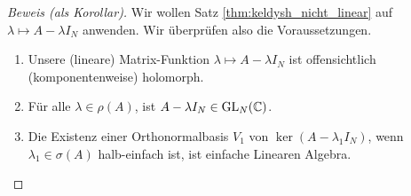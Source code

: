 \begin{proof}[Beweis (als Korollar)]

    Wir wollen Satz \ref{thm:keldysh_nicht_linear} auf $\lambda \mapsto A - \lambda I_N$ anwenden.
    Wir überprüfen also die Voraussetzungen.

    \begin{enumerate}[label = \arabic*.]

        \item Unsere (lineare) Matrix-Funktion $\lambda \mapsto A - \lambda I_N$ ist offensichtlich (komponentenweise) holomorph.

        \item Für alle $\lambda \in \rho(A)$, ist $A - \lambda I_N \in \operatorname{GL}_N(\mathbb{C})$.

        \item Die Existenz einer Orthonormalbasis $V_1$ von $\ker (A - \lambda_1 I_N)$, wenn $\lambda_1 \in \sigma(A)$ halb-einfach ist, ist einfache Linearen Algebra.

        \begin{comment}

            Seien $\lambda_2, \dots, \lambda_k$ die restlichen (paarweise verschiedenen) Eigenwerte von $A$.
            Seien $L_n^\mathrm{geo}$ und $L_n^\mathrm{alg}$ die geometrische bzw. algebraische Vielfachheit von $\lambda_n$ für $n = 2, \dots, k$.
            Betrachte die Jordan Normalform von $A$.
        

\end{comment}
\end{enumerate}
\end{proof}

